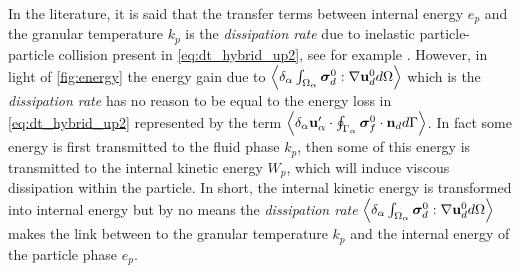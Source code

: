 In the literature, it is said that the transfer terms between internal energy $e_p$ and the granular temperature $k_p$ is the \textit{dissipation rate} due to inelastic particle-particle collision present in \ref{eq:dt_hybrid_up2}, see for example \citet{fox2014multiphase,rao2008introduction}. 
However, in light of \ref{fig:energy} the energy gain due to  $\left<\delta_\alpha \int_{\Omega_{\alpha}} \bm{\sigma}_d^0:\mathbf{\nabla} \textbf{u}_d^0 d\Omega\right>$ which is the \textit{dissipation rate} has no reason to be equal to the energy loss in \ref{eq:dt_hybrid_up2} represented by the term $\left<\delta_\alpha \textbf{u}_\alpha' \cdot \oint_{\Gamma_{\alpha}} \bm{\sigma}_f^0 \cdot \textbf{n}_d d\Gamma\right>$. 
In fact some energy is first transmitted to the fluid phase $k_p$, then some of this energy is transmitted to the internal kinetic energy $W_p$, which will induce viscous dissipation within the particle. 
In short, the internal kinetic energy is transformed into internal energy but by no means the \textit{dissipation rate} $\left<\delta_\alpha \int_{\Omega_{\alpha}} \bm{\sigma}_d^0:\mathbf{\nabla} \textbf{u}_d^0 d\Omega\right>$ makes the link between to the granular temperature $k_p$ and the internal energy of the particle phase $e_p$. 



